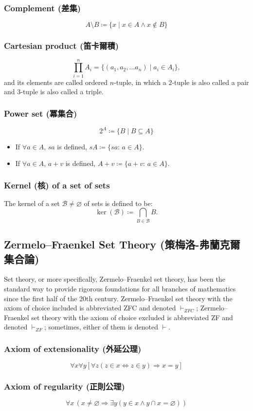 \documentclass[a4paper,12pt]{article}
\begin{document}
\subsubsection{Complement (差集)}
\[A\setminus B\coloneq\{x\mid x\in A \land x\notin B\}\]
\subsubsection{Cartesian product (笛卡爾積)}
\[\prod_{i=1}^nA_i=\{(a_1,a_2,\ldots a_n)\mid a_i\in A_i\},\]
and its elements are called ordered $n$-tuple, in which a $2$-tuple is also called a pair and $3$-tuple is also called a triple.
\subsubsection{Power set (冪集合)}
\[2^A\coloneq\{B\mid B\subseteq A\}\]
\begin{itemize}
\item If $\forall a\in A$, $sa$ is defined, $sA\coloneq\{sa:\,a\in A\}$.
\item If $\forall a\in A$, $a+v$ is defined, $A+v\coloneq\{a+v:\,a\in A\}$.
\end{itemize}
\subsubsection{Kernel (核) of a set of sets}
The kernel of a set $\mathcal {B}\neq \varnothing$ of sets is defined to be:
\[\ker(\mathcal {B})\coloneq\bigcap_{B\in\mathcal {B}}B.\]
\subsection{Zermelo–Fraenkel Set Theory (策梅洛-弗蘭克爾集合論)}
Set theory, or more specifically, Zermelo–Fraenkel set theory, has been the standard way to provide rigorous foundations for all branches of mathematics since the first half of the 20th century. Zermelo–Fraenkel set theory with the axiom of choice included is abbreviated ZFC and denoted $\vdash_{ZFC}$; Zermelo–Fraenkel set theory with the axiom of choice excluded is abbreviated ZF and denoted $\vdash_{ZF}$; sometimes, either of them is denoted $\vdash$.
\subsubsection{Axiom of extensionality (外延公理)}
\[\forall x\forall y[\forall z(z\in x\Leftrightarrow z\in y)\Rightarrow x=y]\]
\subsubsection{Axiom of regularity (正則公理)}
\[\forall x\,(x\neq \varnothing \Rightarrow \exists y(y\in x\land y\cap x=\varnothing ))\]
\end{document}
